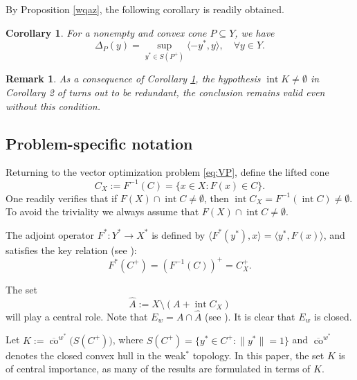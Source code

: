\documentclass[11pt]{article}
\DeclareMathOperator{\intr}{int}
\newtheorem{corollary}{Corollary}[section]
\newtheorem{remark}{Remark}[section]
\begin{document}
By Proposition \ref{wqaz}, the following corollary is readily obtained.
 \begin{corollary}\label{cor:Delta}
 	For a nonempty and  convex cone $P \subseteq Y$,  we have 
 $$
 		\Delta_P(y) = \sup_{y^* \in S(P^+)} \langle -y^*, y \rangle, \quad \forall y \in Y.
$$
 \end{corollary}


\begin{remark}   As a consequence of Corollary \ref{cor:Delta}, the hypothesis $\intr K \neq \emptyset$ in Corollary 2 of \cite{LiuNgYang2009} turns out to be redundant, the conclusion remains valid even without this condition.
  \end{remark}


 
 

\subsection{Problem-specific notation}

Returning to the vector optimization problem \eqref{eq:VP}, define the lifted cone
\[
C_X := F^{-1}(C) = \{x \in X : F(x) \in C\}.
\]
One readily verifies that if \( F(X) \cap \operatorname{int} C \neq \emptyset \), then \( \operatorname{int} C_X = F^{-1}(\operatorname{int} C) \neq \emptyset \).  
To avoid the triviality we always assume that $F(X) \cap \intr C \neq \emptyset$.



The adjoint operator $F^*: Y^* \to X^*$ is defined by $\langle F^*(y^*), x \rangle = \langle y^*, F(x) \rangle$, and satisfies the key relation (see \cite{Zalinescu1978}):
$$
	F^*(C^+) = (F^{-1}(C))^+ = C_X^+.
$$

The set
$$
	\widehat{A} := X \setminus (A + \intr C_X)
$$
will play a central role. Note that $E_w  = A \cap \widehat{A}$ (see \cite[Theorem 1]{LiuNgYang2009}).
It is clear that  $E_w $ is closed.

Let $K := \overline{\operatorname{co}}^{w^*}\big(S(C^+)\big)$,   where $S(C^+)=\{y^*\in C^+:\|y^*\|=1\}$  and ${\overline{\operatorname{co}}}^{w^*}$ denotes the closed convex hull in the weak$^*$ topology.
   In this paper, the set $K$ is of central importance, as many of the results are formulated in terms of $K$.
\end{document}
